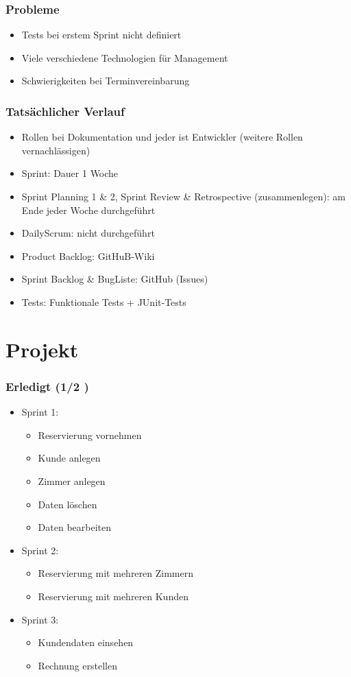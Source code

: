 \documentclass{beamer}
\begin{document}
\begin{frame}
\frametitle{Probleme}
\begin{itemize}
\item Tests bei erstem Sprint nicht definiert
\item Viele verschiedene Technologien f\"ur Management
\item Schwierigkeiten bei Terminvereinbarung
\end{itemize}
\end{frame}

\begin{frame}
\frametitle{Tats\"achlicher Verlauf}
\begin{itemize}
\item Rollen bei Dokumentation und jeder ist Entwickler (weitere Rollen vernachl\"assigen)
\item Sprint: Dauer 1 Woche
\end{itemize}
\begin{itemize}
\item Sprint Planning 1 \& 2, Sprint Review \& Retrospective (zusammenlegen): am Ende jeder Woche durchgef\"uhrt
\item DailyScrum: nicht durchgef\"uhrt
\end{itemize} 
\begin{itemize}
\item Product Backlog: GitHuB-Wiki
\item Sprint Backlog \& BugListe: GitHub (Issues)
\item Tests: Funktionale Tests + JUnit-Tests
\end{itemize}
\end{frame}

\section{Projekt} 

\begin{frame}
\frametitle{Erledigt (1/2 )} 
\begin{itemize}
\item  Sprint 1:
\begin{itemize}
\item  Reservierung vornehmen
\item  Kunde anlegen
\item  Zimmer anlegen
\item  Daten l\"oschen
\item  Daten bearbeiten
\end{itemize}
\item  Sprint 2:
\begin{itemize}
\item  Reservierung mit mehreren Zimmern
\item  Reservierung mit mehreren Kunden
\end{itemize}
\item  Sprint 3:
\begin{itemize}
\item  Kundendaten einsehen
\item  Rechnung erstellen
\end{itemize}
\end{itemize}
\end{frame}
\end{document}
